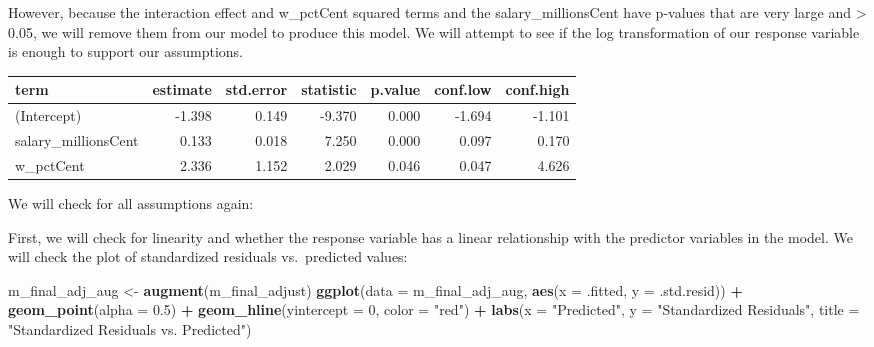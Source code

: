 \documentclass[]{article}
\newenvironment{Shaded}{\begin{snugshade}}{\end{snugshade}}
\newcommand{\DataTypeTok}[1]{\textcolor[rgb]{0.13,0.29,0.53}{#1}}
\newcommand{\DecValTok}[1]{\textcolor[rgb]{0.00,0.00,0.81}{#1}}
\newcommand{\FloatTok}[1]{\textcolor[rgb]{0.00,0.00,0.81}{#1}}
\newcommand{\KeywordTok}[1]{\textcolor[rgb]{0.13,0.29,0.53}{\textbf{#1}}}
\newcommand{\NormalTok}[1]{#1}
\newcommand{\OperatorTok}[1]{\textcolor[rgb]{0.81,0.36,0.00}{\textbf{#1}}}
\newcommand{\OtherTok}[1]{\textcolor[rgb]{0.56,0.35,0.01}{#1}}
\newcommand{\StringTok}[1]{\textcolor[rgb]{0.31,0.60,0.02}{#1}}
\begin{document}
However, because the interaction effect and w\_pctCent squared terms and
the salary\_millionsCent have p-values that are very large and
\textgreater{} 0.05, we will remove them from our model to produce this
model. We will attempt to see if the log transformation of our response
variable is enough to support our assumptions.

\begin{Shaded}
\end{Shaded}

\begin{longtable}[]{@{}lrrrrrr@{}}
\toprule
term & estimate & std.error & statistic & p.value & conf.low &
conf.high\tabularnewline
\midrule
\endhead
(Intercept) & -1.398 & 0.149 & -9.370 & 0.000 & -1.694 &
-1.101\tabularnewline
salary\_millionsCent & 0.133 & 0.018 & 7.250 & 0.000 & 0.097 &
0.170\tabularnewline
w\_pctCent & 2.336 & 1.152 & 2.029 & 0.046 & 0.047 &
4.626\tabularnewline
\bottomrule
\end{longtable}

We will check for all assumptions again:

First, we will check for linearity and whether the response variable has
a linear relationship with the predictor variables in the model. We will
check the plot of standardized residuals vs.~predicted values:

\begin{Shaded}
\begin{Highlighting}[]
\NormalTok{m_final_adj_aug <-}\StringTok{ }\KeywordTok{augment}\NormalTok{(m_final_adjust)}
\KeywordTok{ggplot}\NormalTok{(}\DataTypeTok{data =}\NormalTok{ m_final_adj_aug, }\KeywordTok{aes}\NormalTok{(}\DataTypeTok{x =}\NormalTok{ .fitted, }\DataTypeTok{y =}\NormalTok{ .std.resid)) }\OperatorTok{+}
\StringTok{  }\KeywordTok{geom_point}\NormalTok{(}\DataTypeTok{alpha =} \FloatTok{0.5}\NormalTok{) }\OperatorTok{+}\StringTok{ }
\StringTok{  }\KeywordTok{geom_hline}\NormalTok{(}\DataTypeTok{yintercept =} \DecValTok{0}\NormalTok{, }\DataTypeTok{color =} \StringTok{"red"}\NormalTok{) }\OperatorTok{+}
\StringTok{  }\KeywordTok{labs}\NormalTok{(}\DataTypeTok{x =} \StringTok{"Predicted"}\NormalTok{, }\DataTypeTok{y =} \StringTok{"Standardized Residuals"}\NormalTok{, }
       \DataTypeTok{title =} \StringTok{"Standardized Residuals vs. Predicted"}\NormalTok{)}
\end{Highlighting}
\end{Shaded}
\end{document}
